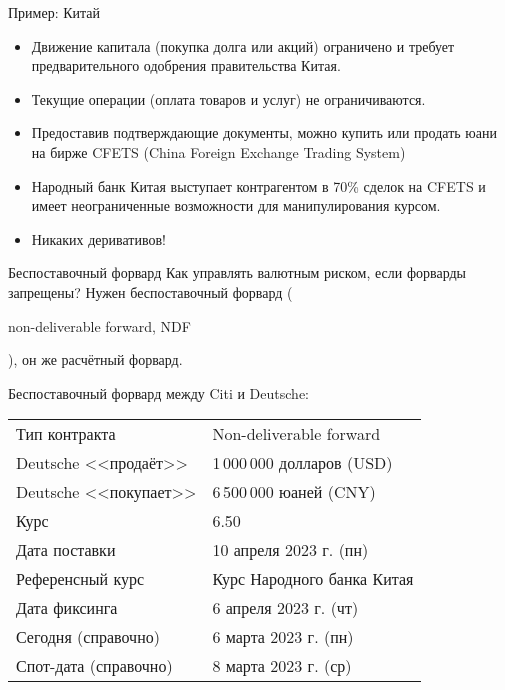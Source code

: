 \documentclass{beamer}
\newcommand{\en}[1]{\begin{otherlanguage}{english}#1\end{otherlanguage}}
\begin{document}
\begin{frame}{Пример: Китай}
\begin{itemize}
\justifying
\item Движение капитала (покупка долга или акций) ограничено и требует предварительного одобрения правительства Китая.

\item Текущие операции (оплата товаров и услуг) не ограничиваются. 

\item Предоставив подтверждающие документы, можно купить или продать юани на бирже CFETS (China Foreign Exchange Trading System)

\item Народный банк Китая выступает контрагентом в 70\% сделок на CFETS и имеет неограниченные возможности для манипулирования курсом.

\item Никаких деривативов!
\end{itemize}
\end{frame}



\begin{frame}{Беспоставочный форвард}
\justify
Как управлять валютным риском, если форварды запрещены? Нужен \alert{беспоставочный форвард} (\en{non-deliverable forward, NDF}), он же расчётный форвард.

\justify
Беспоставочный форвард между Citi и Deutsche:

\justify
\centering
\begin{tabular}{l|l}
	Тип контракта 		   & Non-deliverable forward		\\
	Deutsche <<продаёт>>  & 1\,000\,000 долларов (USD)	\\
	Deutsche <<покупает>> & 6\,500\,000 юаней (CNY)		\\
	Курс		 		      & 6.50 						\\
	Дата поставки		   & 10 апреля 2023 г. (пн) \\
	Референсный курс	   & Курс Народного банка Китая	\\
	Дата фиксинга		   & 6 апреля 2023 г. (чт) \\
	Сегодня (справочно)	& 6 марта 2023 г. (пн) \\
	Спот-дата (справочно) & 8 марта 2023 г. (ср)
\end{tabular}
\end{frame}
\end{document}
